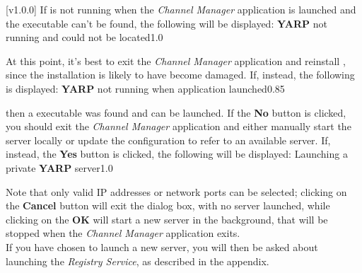 [v1.0.0]
If \yarp{} is not running when the \emph{Channel Manager} application is launched and the
\yarp{} executable can't be found, the following will be displayed:
%
{\textbf{YARP} not running and could not be located}{1.0}

At this point, it's best to exit the \emph{Channel Manager} application and reinstall
\mplusm{}, since the installation is likely to have become damaged.
If, instead, the following is displayed:
%
{\textbf{YARP} not running when application launched}{0.85}

then a \yarp{} executable was found and can be launched.
If the \textbf{No} button is clicked, you should exit the \emph{Channel Manager}
application and either manually start the \yarp{} server locally or update the \yarp{}
configuration to refer to an available \yarp{} server.
\clearpage
If, instead, the \textbf{Yes} button is clicked, the following will be displayed:
%
{Launching a private \textbf{YARP} server}{1.0}

Note that only valid IP addresses or network ports can be selected; clicking on the
\textbf{Cancel} button will exit the dialog box, with no \yarp{} server launched, while
clicking on the \textbf{OK} will start a new \yarp{} server in the background, that will
be stopped when the \emph{Channel Manager} application exits.\\

If you have chosen to launch a new \yarp{} server, you will then be asked about launching
the \emph{Registry Service}, as described in the
 appendix.
\appendixEnd{}
